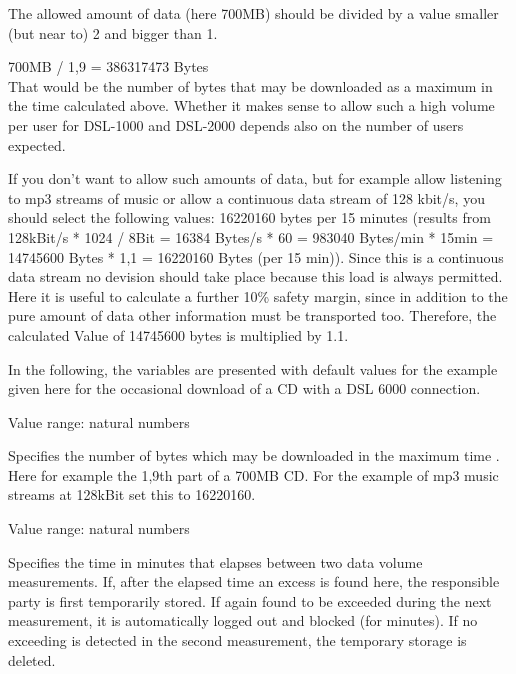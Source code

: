 \begin{description}
\begin{tabular}{lrlrl}
   \end{tabular}

   The allowed amount of data (here 700MB) should be divided by a value smaller (but near to) 2 and bigger than 1.

    700MB / 1,9 = 386317473 Bytes \\
   That would be the number of bytes that may be downloaded as a maximum in the time calculated above. Whether it
   makes sense to allow such a high volume per user for DSL-1000 and DSL-2000 depends  also on the number of users
   expected.

   If you don't want to allow such amounts of data, but for example allow listening to mp3 streams of music or
   allow a continuous data stream of 128 kbit/s, you should select the following values: 16220160 bytes per 15
   minutes (results from 128kBit/s * 1024 / 8Bit = 16384 Bytes/s * 60 = 983040 Bytes/min * 15min = 14745600 Bytes
   * 1,1 = 16220160 Bytes (per 15 min)). Since this is a continuous data stream no devision should take place
   because this load is always permitted. Here it is useful to calculate a further 10\% safety margin, since in
   addition to the pure amount of data other information must be transported too. Therefore, the calculated
   Value of 14745600 bytes is multiplied by 1.1.

   In the following, the variables are presented with default values for the example given here for the
   occasional download of a CD with a DSL 6000 connection.



   Value range: natural numbers

   Specifies the number of bytes which may be downloaded in the maximum time 
   {}. Here for example the 1,9th part of a 700MB CD. For the example of mp3 music
   streams at 128kBit set this to 16220160.



   Value range: natural numbers

   Specifies the time in minutes that elapses between two data volume measurements. If, after the
   elapsed time an excess is found here, the responsible party is first temporarily stored. If again
   found to be exceeded during the next measurement, it is automatically logged out and blocked
   (for  minutes). If no exceeding
   is detected in the second measurement, the temporary storage is deleted.


\end{description}
